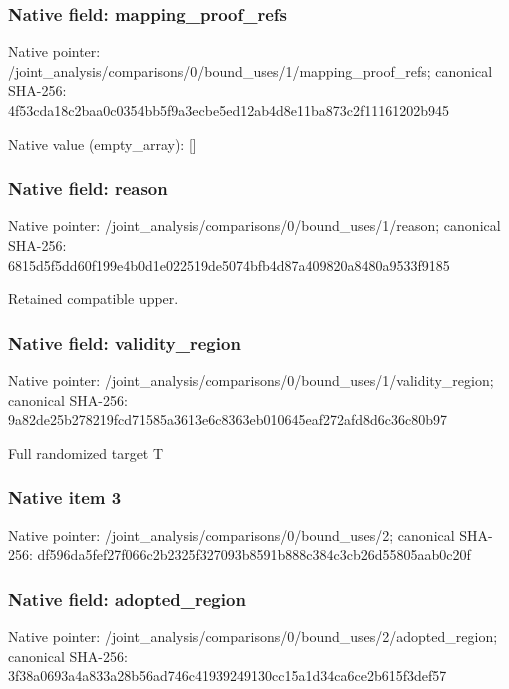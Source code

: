 \documentclass[10pt,a4paper]{article}
\begin{document}
\subsubsection{Native field: mapping\_\allowbreak{}proof\_\allowbreak{}refs}
Native pointer: /joint\_\allowbreak{}analysis/comparisons/0/bound\_\allowbreak{}uses/1/mapping\_\allowbreak{}proof\_\allowbreak{}refs; canonical SHA-256: 4f53cda18c2baa0c0354bb5f9a3ecbe5ed12ab4d8e11ba873c2f11161202b945

Native value (empty\_\allowbreak{}array): []

\subsubsection{Native field: reason}
Native pointer: /joint\_\allowbreak{}analysis/comparisons/0/bound\_\allowbreak{}uses/1/reason; canonical SHA-256: 6815d5f5dd60f199e4b0d1e022519de5074bfb4d87a409820a8480a9533f9185

\begingroup\raggedright\sloppy Retained compatible upper.\par\endgroup

\subsubsection{Native field: validity\_\allowbreak{}region}
Native pointer: /joint\_\allowbreak{}analysis/comparisons/0/bound\_\allowbreak{}uses/1/validity\_\allowbreak{}region; canonical SHA-256: 9a82de25b278219fcd71585a3613e6c8363eb010645eaf272afd8d6c36c80b97

\begingroup\raggedright\sloppy Full randomized target T\par\endgroup

\subsubsection{Native item 3}
Native pointer: /joint\_\allowbreak{}analysis/comparisons/0/bound\_\allowbreak{}uses/2; canonical SHA-256: df596da5fef27f066c2b2325f327093b8591b888c384c3cb26d55805aab0c20f

\subsubsection{Native field: adopted\_\allowbreak{}region}
Native pointer: /joint\_\allowbreak{}analysis/comparisons/0/bound\_\allowbreak{}uses/2/adopted\_\allowbreak{}region; canonical SHA-256: 3f38a0693a4a833a28b56ad746c41939249130cc15a1d34ca6ce2b615f3def57
\end{document}
